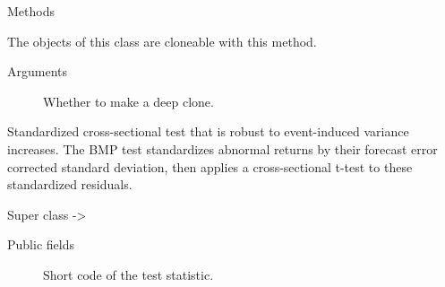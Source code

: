\documentclass[a4paper]{book}
\begin{document}
\begin{Section}{Methods}
\hypertarget{method-BHARTTest-clone}{}
%
\begin{SubSection}{}
The objects of this class are cloneable with this method.
%

%
\begin{SubSubSection}{Arguments}

\begin{description}

\item[] Whether to make a deep clone.

\end{description}



\end{SubSubSection}

\end{SubSection}


\end{Section}
%
\begin{Description}
Standardized cross-sectional test that is robust to event-induced variance
increases. The BMP test standardizes abnormal returns by their forecast
error corrected standard deviation, then applies a cross-sectional
t-test to these standardized residuals.
\end{Description}
%
\begin{Section}{Super class}
 -> 
\end{Section}
%
\begin{Section}{Public fields}

\begin{description}

\item[] Short code of the test statistic.

\end{description}


\end{Section}
%
\end{document}
